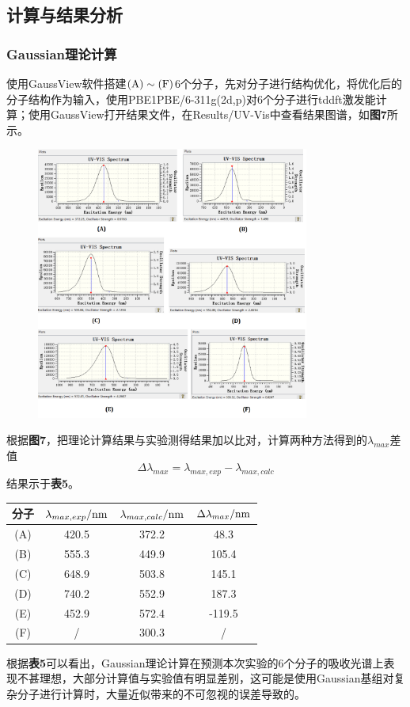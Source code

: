 \documentclass[12pt]{article}
\begin{document}
\subsection{计算与结果分析}
\subsubsection{Gaussian理论计算}
使用GaussView软件搭建$\rm (A)\sim (F)$6个分子，先对分子进行结构优化，将优化后的分子结构作为输入，使用PBE1PBE/6-311g(2d,p)对6个分子进行tddft激发能计算\citealp{ljr}；使用GaussView打开结果文件，在Results/UV-Vis中查看结果图谱，如\textbf{图7}所示。
 \begin{figure}[h]
	\centering
	\includegraphics[width=0.8\textwidth]{7.png}
\end{figure}
\par 
根据\textbf{图7}，把理论计算结果与实验测得结果加以比对，计算两种方法得到的$\lambda_{max}$差值
$$\Delta\lambda_{max}=\lambda_{max, exp}-\lambda_{max, calc}
$$
结果示于\textbf{表5}。
\begin{table}[h]
	\centering
	\begin{tabular}{cccc}
		\toprule
		分子  & $\lambda_{max, exp}/{\rm nm} $ & $\lambda_{max, calc} / {\rm nm} $& $\Delta\lambda_{max}/{\rm nm} $  \\
		\midrule
		(A) & 420.5 & 372.2 & 48.3 \\
		(B) & 555.3 & 449.9 & 105.4 \\
		(C) & 648.9 & 503.8 & 145.1 \\
		(D) & 740.2 & 552.9 & 187.3 \\
		(E) & 452.9 & 572.4 & -119.5 \\
		(F) & / & 300.3 & / \\		
		\bottomrule
	\end{tabular}
\end{table}
\par
根据\textbf{表5}可以看出，Gaussian理论计算在预测本次实验的6个分子的吸收光谱上表现不甚理想，大部分计算值与实验值有明显差别，这可能是使用Gaussian基组对复杂分子进行计算时，大量近似带来的不可忽视的误差导致的。
\end{document}
